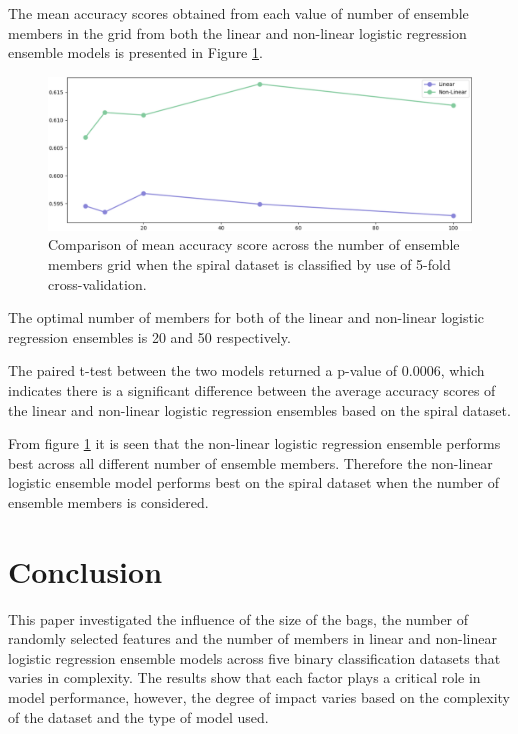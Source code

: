 \documentclass[10pt, conference]{IEEEtran}
\begin{document}
The mean accuracy scores obtained from each value of number of ensemble members in the grid from both the linear and non-linear
logistic regression ensemble models is presented in Figure \ref{fig:S_member_comparison}.
\begin{figure}[H]
    \centerline{\includegraphics[scale=0.26]{../Images/S_members.PNG}}
    \caption{Comparison of mean accuracy score across the number of ensemble members grid when the spiral dataset is classified by use of 5-fold cross-validation.}
    \label{fig:S_member_comparison}
\end{figure}
The optimal number of members for both of the linear and non-linear logistic regression ensembles is 20 and 50 respectively.

The paired t-test between the two models returned a p-value of 0.0006, which indicates there is a significant difference
between the average accuracy scores of the linear and non-linear logistic regression ensembles based on the spiral dataset.

From figure \ref{fig:S_member_comparison} it is seen that the non-linear logistic regression ensemble performs best across
all different number of ensemble members. Therefore the non-linear logistic ensemble model performs best on the spiral dataset when the
number of ensemble members is considered.

\section{Conclusion} \label{section: Conclusion}

This paper investigated the influence of the size of the bags, the number of randomly selected features and
the number of members in linear and non-linear logistic regression ensemble models across five binary classification
datasets that varies in complexity. The results show that each factor plays a critical role in model performance,
however, the degree of impact varies based on the complexity of the dataset and the type of model used.
\end{document}
